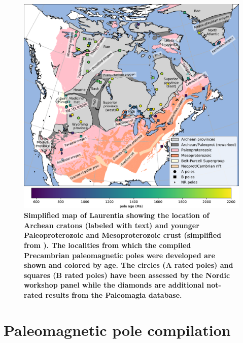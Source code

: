 \documentclass[11pt,letterpaper]{article}
\begin{document}
\begin{figure}
\centering
\includegraphics[width=6.5 in]{Figures/Fig1_map.pdf}
\caption{\small{\textbf{Simplified map of Laurentia showing the location of Archean cratons (labeled with text) and younger Paleoproterozoic and Mesoproterozoic crust (simplified from \cite{Whitmeyer2007a}). The localities from which the compiled Precambrian paleomagnetic poles were developed are shown and colored by age. The circles (A rated poles) and squares (B rated poles) have been assessed by the Nordic workshop panel while the diamonds are additional not-rated results from the Paleomagia database.}}}
\label{fig:Laurentia_map}
\end{figure}

\section{Paleomagnetic pole compilation}
\end{document}
